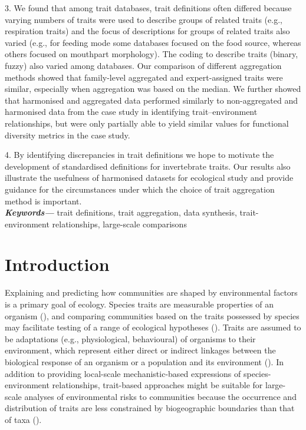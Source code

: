 \documentclass[12pt]{article}
\providecommand{\keywords}[1]
{
  {\small	
  \textbf{\textit{Keywords---}} #1
}}
\begin{document}
3. We found that among trait databases, trait definitions often differed because varying numbers of traits were used to describe groups of related traits (e.g., respiration traits) and the focus of descriptions for groups of related traits also varied (e.g., for feeding mode some databases focused on the food source, whereas others focused on mouthpart morphology). The coding to describe traits (binary, fuzzy) also varied among databases. Our comparison of different aggregation methods showed that family-level aggregated and expert-assigned traits were similar, especially when aggregation was based on the median.
We further showed that harmonised and aggregated data performed similarly to non-aggregated and harmonised data from the case study in identifying trait–environment relationships, but were only partially able to yield similar values for functional diversity metrics in the case study.

4. By identifying discrepancies in trait definitions we hope to motivate the development of standardised definitions for invertebrate traits. Our results also illustrate the usefulness of harmonised datasets for ecological study and provide guidance for the circumstances under which the choice of trait aggregation method is important.
\\
\keywords{trait definitions, trait aggregation, data synthesis, trait-environment relationships, large-scale comparisons}


\newpage

\section*{Introduction}

Explaining and predicting how communities are shaped by environmental factors is a primary goal of ecology. Species traits are measurable properties of an organism (\cite{mcgill_rebuilding_2006}), and comparing communities based on the traits possessed by species may facilitate testing of a range of ecological hypotheses (\cite{statzner_perspectives_2001}). Traits are assumed to be adaptations (e.g., physiological, behavioural) of organisms to their environment, which represent either direct or indirect linkages between the biological response of an organism or a population and its environment (\cite{southwood_habitat_1977, verberk_delivering_2013}). In addition to providing local-scale mechanistic-based expressions of species-environment relationships, trait-based approaches might be suitable for large-scale analyses of environmental risks to communities because the occurrence and distribution of traits are less constrained by biogeographic boundaries than that of taxa (\cite{baird_toward_2011, bonada_taxonomic_2007}). 
\end{document}
